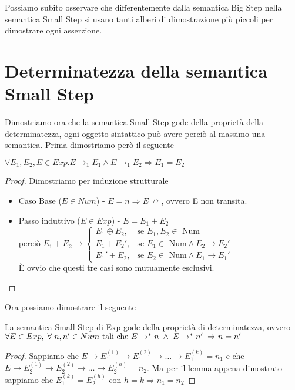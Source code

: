 Possiamo subito osservare che differentemente dalla semantica Big Step
nella semantica Small Step si usano tanti alberi di dimostrazione più piccoli per dimostrare
ogni asserzione. 

\section{Determinatezza della semantica Small Step} 
Dimostriamo ora che la semantica Small Step gode della proprietà
della determinatezza, ogni oggetto sintattico può avere perciò
al massimo una semantica. Prima dimostriamo però il seguente

\begin{lemma}
$\forall E_1, E_2, E \in Exp . E \rightarrow _1 E_1 \land E \rightarrow _1 E_2 \Rightarrow E_1 = E_2 $
\end{lemma}

\begin{proof}
  Dimostriamo per induzione strutturale
  \begin{itemize}
  \item Caso Base ($E \in Num$) - $E = n \Rightarrow E \nrightarrow$, ovvero E non transita.
  \item Passo induttivo ($E \in Exp$) - $E = E_1 + E_2$ \\
    perciò $E_1 + E_2 \rightarrow \begin{cases} E_1 \oplus E_2, & \mbox{se }E_1, E_2 \in \mbox{ Num} \\
    E_1 + E_2', & \mbox{se }E_1 \in \mbox{ Num} \land E_2 \rightarrow E_2' \\
    E_1' + E_2, & \mbox{se }E_2 \in \mbox{ Num} \land E_1 \rightarrow E_1' \end{cases}$\\
    È ovvio che questi tre casi sono mutuamente esclusivi.
  \end{itemize}
\end{proof}

Ora possiamo dimostrare il seguente

\begin{teorema}[Determinatezza]
La semantica Small Step di Exp gode della proprietà di determinatezza, ovvero
$\forall E \in Exp, \; \forall \; n, n' \in Num \text{ tali che }\\
 E\rightarrow ^* n \; \land \; E \rightarrow ^* n' \; \Rightarrow n = n'$
\end{teorema}

\begin{proof}
  Sappiamo che $E \rightarrow E_1^{(1)} \rightarrow E_1^{(2)} \rightarrow \dots \rightarrow E_1^{(k)} = n_1$ e che 
  $E \rightarrow E_2^{(1)} \rightarrow E_2^{(2)} \rightarrow \dots \rightarrow E_2^{(h)} = n_2$.
  Ma per il lemma appena dimostrato sappiamo che $E_1^{(k)} = E_2^{(h)} \text{ con } h = k \Rightarrow n_1 = n_2$
\end{proof}

